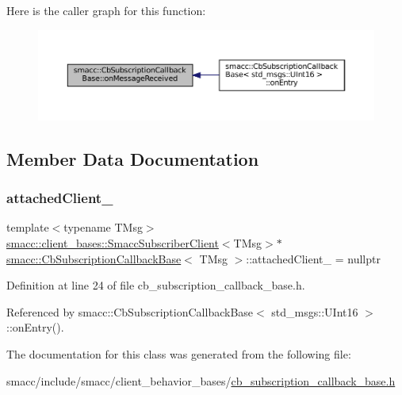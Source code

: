 Here is the caller graph for this function\+:
\nopagebreak
\begin{figure}[H]
\begin{center}
\leavevmode
\includegraphics[width=350pt]{classsmacc_1_1CbSubscriptionCallbackBase_a77d8d3eee701b990277e69804eac0049_icgraph}
\end{center}
\end{figure}


\subsection{Member Data Documentation}
\mbox{\label{classsmacc_1_1CbSubscriptionCallbackBase_af6f6d8dd53447934d90d6d71bdcc10cb}} 
\subsubsection{\texorpdfstring{attached\+Client\+\_\+}{attachedClient\_}}
{\footnotesize\ttfamily template$<$typename T\+Msg$>$ \\
\hyperlink{classsmacc_1_1client__bases_1_1SmaccSubscriberClient}{smacc\+::client\+\_\+bases\+::\+Smacc\+Subscriber\+Client}$<$T\+Msg$>$$\ast$ \hyperlink{classsmacc_1_1CbSubscriptionCallbackBase}{smacc\+::\+Cb\+Subscription\+Callback\+Base}$<$ T\+Msg $>$\+::attached\+Client\+\_\+ = nullptr\hspace{0.3cm}{\ttfamily [protected]}}



Definition at line 24 of file cb\+\_\+subscription\+\_\+callback\+\_\+base.\+h.



Referenced by smacc\+::\+Cb\+Subscription\+Callback\+Base$<$ std\+\_\+msgs\+::\+U\+Int16 $>$\+::on\+Entry().



The documentation for this class was generated from the following file\+:\begin{DoxyCompactItemize}
\item 
smacc/include/smacc/client\+\_\+behavior\+\_\+bases/\hyperlink{cb__subscription__callback__base_8h}{cb\+\_\+subscription\+\_\+callback\+\_\+base.\+h}\end{DoxyCompactItemize}

